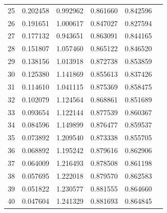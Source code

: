 \begin{table}[ht]
{\begin{tabular}{c c c c c c}
25 & 0.202458 & 0.992962 & 0.861660 & 0.842596 \\
26 & 0.191651 & 1.000617 & 0.847027 & 0.827594 \\
27 & 0.177132 & 0.943651 & 0.863091 & 0.844165 \\
28 & 0.151807 & 1.057460 & 0.865122 & 0.846520 \\
29 & 0.138156 & 1.013918 & 0.872738 & 0.853859 \\
30 & 0.125380 & 1.141869 & 0.855613 & 0.837426 \\
31 & 0.114610 & 1.041115 & 0.875369 & 0.858475 \\
32 & 0.102079 & 1.124564 & 0.868861 & 0.851689 \\
33 & 0.093654 & 1.122144 & 0.877539 & 0.860367 \\
34 & 0.084596 & 1.149899 & 0.876477 & 0.859537 \\
35 & 0.073892 & 1.209540 & 0.873338 & 0.855705 \\
36 & 0.068892 & 1.195242 & 0.879616 & 0.862906 \\
37 & 0.064009 & 1.216493 & 0.878508 & 0.861198 \\
38 & 0.057695 & 1.222018 & 0.879570 & 0.862583 \\
39 & 0.051822 & 1.230577 & 0.881555 & 0.864660 \\
40 & 0.047604 & 1.241329 & 0.881693 & 0.864845 \\
\hline
\end{tabular}
}
\end{table}


